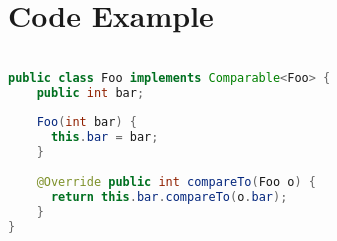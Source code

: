 \section{Code Example}

\begin{lstlisting}[language=Java]

public class Foo implements Comparable<Foo> {
    public int bar;
    
    Foo(int bar) {
      this.bar = bar;
    }
    
    @Override public int compareTo(Foo o) {
      return this.bar.compareTo(o.bar);
    }
}
    
\end{lstlisting}